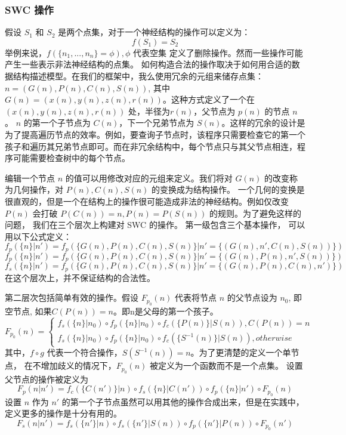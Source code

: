 {\subsubsection{SWC 操作}
假设 $S_1$ 和 $S_2$ 是两个点集，对于一个神经结构的操作可以定义为：
$$f(S_1) = S_2$$
举例来说，$f(\{n_1,...,n_n \} = \phi), \phi$ 代表空集 定义了删除操作。然而一些操作可能产生一些表示非法神经结构的点集。 如何构造合法的操作取决于如何用合适的数据结构描述模型。在我们的框架中，我么使用冗余的元组来储存点集：$n=(G(n), P(n), C(n), S(n))$, 其中 $G(n) = (x(n), y(n), z(n), r(n))$。这种方式定义了一个在$(x(n), y(n), z(n), r(n))$ 处，半径为$r(n)$，父节点为 $p(n)$ 的节点 $n$。 $n$ 的第一个子节点为 $C(n)$，下一个兄弟节点为 $S(n)$。这样的冗余的设计是为了提高遍历节点的效率。例如，要查询子节点时，该程序只需要检查它的第一个孩子和遍历其兄弟节点即可。而在非冗余结构中，每个节点只与其父节点相连，程序可能需要检查树中的每个节点。

编辑一个节点 $n$ 的值可以用修改对应的元组来定义。我们将对 $G(n)$ 的改变称为几何操作，对 $P(n), C(n), S(n) $ 的变换成为结构操作。 一个几何的变换是很直观的，但是一个在结构上的操作很可能造成非法的神经结构。例如仅改变 $P(n)$ 会打破 $P(C(n)) = n, P(n) = P(S(n))$ 的规则。为了避免这样的问题， 我们在三个层次上构建对 SWC 的操作。 第一级包含三个基本操作， 可以用以下公式定义：
$$f_p(\{n\}|n') = f_p(\{G(n), P(n), C(n), S(n)\}|n' = \{(G(n), n', C(n), S(n))\})$$
$$f_p(\{n\}|n') = f_p(\{G(n), P(n), C(n), S(n)\}|n' = \{(G(n), P(n), n', S(n))\})$$
$$f_s(\{n\}|n') = f_p(\{G(n), P(n), C(n), S(n)\}|n' = \{(G(n), P(n), C(n), n')\})$$
在这个层次上，并不保证结构的合法性。

第二层次包括简单有效的操作。假设 $F_{p_0}(n)$ 代表将节点 $n$ 的父节点设为 $n_0$, 即空节点, 如果$C(P(n)) = n$。即n是父母的第一个孩子。
$$
F_{p_0}(n) =
\left\{
\begin{aligned}
f_s(\{n\} | n_0) \circ f_p(\{n\} | n_0) \circ f_c(\{P(n)\} | S(n)), C(P(n)) = n\\
f_s(\{n\} | n_0) \circ f_p(\{n\} | n_0) \circ f_c(\{S^{-1}(n)\} | S(n)), otherwise
\end{aligned}
\right.
$$
其中，$f \circ g$ 代表一个符合操作，$S(S^{-1}(n)) = n$。为了更清楚的定义一个单节点， 在不增加歧义的情况下，$F_{p_0}(n)$ 被定义为一个函数而不是一个点集。
设置父节点的操作被定义为
$$F_p(n|n') = f_c(\{C(n')\}|n) \circ f_s(\{n\}|C(n'))  \circ f_p(\{n\}|n') \circ F_{p_0}(n)$$
设置 $n$ 作为 $n'$ 的第一个子节点虽然可以用其他的操作合成出来，但是在实践中，定义更多的操作是十分有用的。
$$F_s(n|n') = f_s(\{n'\}|n) \circ f_s(\{n'\}|S(n))  \circ f_p(\{n'\}|P(n)) \circ F_{p_0}(n')$$

}
